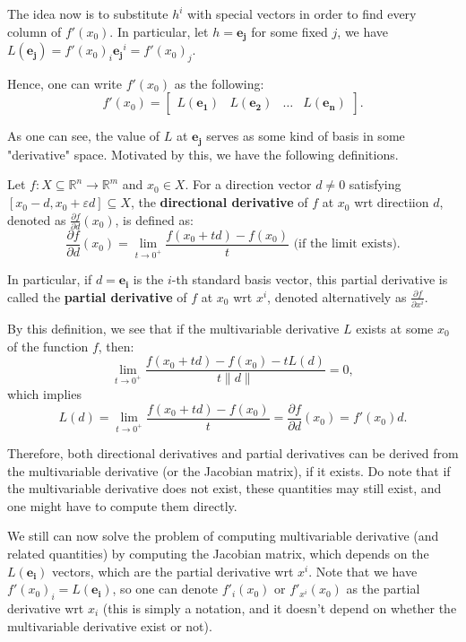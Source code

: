 The idea now is to substitute \( h^{i} \) with special vectors in order to find
every column of \( f'(x_{0}) \). In particular, let \( h = \mathbf{e_{j}} \) for
some fixed \( j \), we have \( L(\mathbf{e_{j}}) =
f'(x_{0})_{i}\mathbf{e_{j}}^{i} = f'(x_{0})_{j} \).

Hence, one can write \( f'(x_{0}) \) as the following:
\[
  f'(x_{0}) = \begin{bmatrix} L(\mathbf{e_{1}}) & L(\mathbf{e_{2}}) & \ldots  &
  L(\mathbf{e_{n}})\end{bmatrix} 
.\] 

As one can see, the value of \( L \) at \( \mathbf{e_{j}} \) serves as some kind
of basis in some "derivative" space. Motivated by this, we have the following
definitions.

\begin{definition}
\label{def:Directional and Partial derivative}
  Let \( f: X \subseteq \mathbb{R}^{n} \to  \mathbb{R}^{m} \) and \( x_{0} \in
  X \). For a direction vector \( d \neq 0 \) satisfying \( [x_{0}-d,
  x_{0}+\varepsilon d]  \subseteq X  \), the \textbf{directional
  derivative} of \( f \) at \( x_{0} \) wrt directiion \( d \), denoted as
  \(\frac{\partial f}{\partial d}(x_{0})\), is defined as:
  \[
    \frac{\partial f}{\partial d}(x_{0}) = \lim_{t \to 0^{+}} \frac{f(x_{0}+t d)
    - f(x_{0})}{t } \text{ (if the limit exists)}
  .\]

  In particular, if \( d = \mathbf{e_{i}} \) is the \( i \)-th standard basis
  vector, this partial derivative is called the \textbf{partial derivative} of
  \( f \) at \( x_{0} \) wrt \( x^{i} \), denoted alternatively as \(
  \frac{\partial f}{\partial x^{i}} \).
\end{definition}

By this definition, we see that if the multivariable derivative \( L \) exists
at some \( x_{0} \) of the function \( f \), then:
\[
  \lim_{t \to 0^{+}} \frac{f(x_{0} + t d) - f(x_{0}) - tL(d)}{t \|d\|} = 0 
,\] which implies
\[
  L(d) = \lim_{t \to  0^{+}} \frac{f(x_{0} + t d) - f(x_{0})}{t} =
\frac{\partial f}{\partial d}(x_{0}) = f'(x_{0})d.\] 

Therefore, both directional derivatives and partial derivatives can be derived
from the multivariable derivative (or the Jacobian matrix), if it exists. Do
note that if the multivariable derivative does not exist, these quantities may
still exist, and one might have to compute them directly.

We still can now solve the problem of computing multivariable derivative (and
related quantities) by computing the Jacobian matrix, which depends on the \(
L(\mathbf{e_{i}}) \) vectors, which are the partial derivative wrt \( x^{i} \).
Note that we have \( f'(x_{0})_{i} = L(\mathbf{e_{i}}) \), so one can denote \(
f'_{i}(x_{0})\) or \( f'_{x^{i}}(x_{0}) \) as the partial derivative wrt \( x_{i} \) (this is simply a
notation, and it doesn't depend on whether the multivariable derivative exist or
not).

